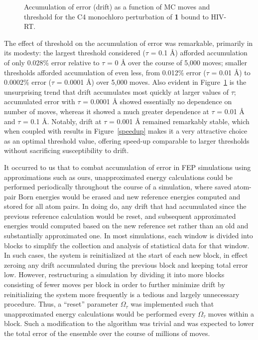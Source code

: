 \documentclass[12pt]{report}
\def\figlab{Figure}\def\figslab{\figlab s}
\newcommand*\fig[1]{\figlab~\ref{#1}}
\begin{document}
\begin{figure}[t]
\centering

\caption{Accumulation of error (drift) as a function of MC moves and threshold for the C4 monochloro perturbation of \textbf{1} bound to HIV-RT.}
\label{drift}
\end{figure}

The effect of threshold on the accumulation of error was remarkable, primarily in its modesty: the largest threshold considered ($\tau$ = 0.1 \AA) afforded accumulation of only 0.028\% error relative to $\tau$ = 0 \AA{} over the course of 5,000 moves; smaller thresholds afforded accumulation of even less, from 0.012\% error ($\tau$ = 0.01 \AA) to 0.0002\% error ($\tau$ = 0.0001 \AA) over 5,000 moves. Also evident in \fig{drift} is the unsurprising trend that drift accumulates most quickly at larger values of $\tau$; accumulated error with $\tau$ = 0.0001 \AA{} showed essentially no dependence on number of moves, whereas it showed a much greater dependence at $\tau$ = 0.01 \AA{} and $\tau$ = 0.1 \AA. Notably, drift at $\tau$ = 0.001 \AA{} remained remarkably stable, which when coupled with results in \fig{speedup} makes it a very attractive choice as an optimal threshold value, offering speed-up comparable to larger thresholds without sacrificing susceptibility to drift. 

It occurred to us that to combat accumulation of error in FEP simulations using approximations such as ours, unapproximated energy calculations could be performed periodically throughout the course of a simulation, where saved atom-pair Born energies would be erased and new reference energies computed and stored for all atom pairs. In doing do, any drift that had accumulated since the previous reference calculation would be reset, and subsequent approximated energies would computed based on the new reference set rather than an old and substantially approximated one. In most simulations, each window is divided into blocks to simplify the collection and analysis of statistical data for that window. In such cases, the system is reinitialized at the start of each new block, in effect zeroing any drift accumulated during the previous block and keeping total error low. However, restructuring a simulation by dividing it into more blocks consisting of fewer moves per block in order to further minimize drift by reinitializing the system more frequently is a tedious and largely unnecessary procedure. Thus, a ``reset'' parameter $\Omega_\tau$ was implemented such that unapproximated energy calculations would be performed every $\Omega_\tau$ moves within a block. Such a modification to the algorithm was trivial and was expected to lower the total error of the ensemble over the course of millions of moves.
\end{document}
